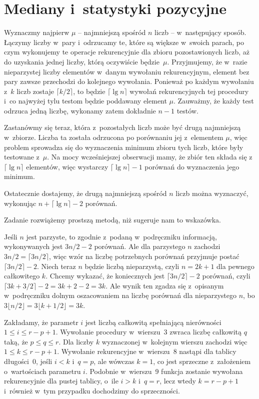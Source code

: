 \chapter{Mediany i~statystyki pozycyjne}


\exercise %
Wyznaczmy najpierw $\mu$ -- najmniejszą spośród $n$ liczb -- w~następujący sposób. Łączymy liczby w~pary i~odrzucamy te, które są większe w~swoich parach, po czym wykonujemy te operacje rekurencyjnie dla zbioru pozostawionych liczb, aż do uzyskania jednej liczby, którą oczywiście będzie~$\mu$. Przyjmujemy, że w~razie nieparzystej liczby elementów w~danym wywołaniu rekurencyjnym, element bez pary zawsze przechodzi do kolejnego wywołania. Ponieważ po każdym wywołaniu z~$k$ liczb zostaje $\lceil k/2\rceil$, to będzie $\lceil\lg n\rceil$ wywołań rekurencyjnych tej procedury i~co najwyżej tylu testom będzie poddawany element $\mu$. Zauważmy, że każdy test odrzuca jedną liczbę, wykonamy zatem dokładnie $n-1$ testów.

Zastanówmy się teraz, która z~pozostałych liczb może być drugą najmniejszą w~zbiorze. Liczba ta została odrzucona po porównaniu jej z~elementem $\mu$, więc problem sprowadza się do wyznaczenia minimum zbioru tych liczb, które były testowane z~$\mu$. Na mocy wcześniejszej obserwacji mamy, że zbiór ten składa się z~$\lceil\lg n\rceil$ elementów, więc wystarczy $\lceil\lg n\rceil-1$ porównań do wyznaczenia jego minimum.

Ostatecznie dostajemy, że drugą najmniejszą spośród $n$ liczb można wyznaczyć, wykonując $n+\lceil\lg n\rceil-2$ porównań.

\exercise %
Zadanie rozwiążemy prostszą metodą, niż sugeruje nam to wskazówka.

Jeśli $n$ jest parzyste, to zgodnie z~podaną w~podręczniku informacją, wykonywanych jest $3n/2-2$ porównań. Ale dla parzystego $n$ zachodzi $3n/2=\lceil3n/2\rceil$, więc wzór na liczbę potrzebnych porównań przyjmuje postać $\lceil3n/2\rceil-2$. Niech teraz $n$ będzie liczbą nieparzystą, czyli $n=2k+1$ dla pewnego całkowitego $k$. Chcemy wykazać, że koniecznych jest $\lceil3n/2\rceil-2$ porównań, czyli $\lceil3k+3/2\rceil-2=3k+2-2=3k$. Ale wynik ten zgadza się z~opisanym w~podręczniku dolnym oszacowaniem na liczbę porównań dla nieparzystego $n$, bo $3\lfloor n/2\rfloor=3\lfloor k+1/2\rfloor=3k$.


\exercise %
Zakładamy, że parametr $i$ jest liczbą całkowitą spełniającą nierówności $1\le i\le r-p+1$. Wywołanie procedury  w~wierszu~3 zwraca liczbę całkowitą $q$ taką, że $p\le q\le r$. Dla liczby $k$ wyznaczonej w~kolejnym wierszu zachodzi więc $1\le k\le r-p+1$. Wywołanie rekurencyjne w~wierszu~8 nastąpi dla tablicy długości~0, jeśli $i<k$ i~$q=p$, ale wówczas $k=1$, co jest sprzeczne z~założeniem o~wartościach parametru $i$. Podobnie w~wierszu~9 funkcja zostanie wywołana rekurencyjnie dla pustej tablicy, o~ile $i>k$ i~$q=r$, lecz wtedy $k=r-p+1$ i~również w~tym przypadku dochodzimy do sprzeczności.

